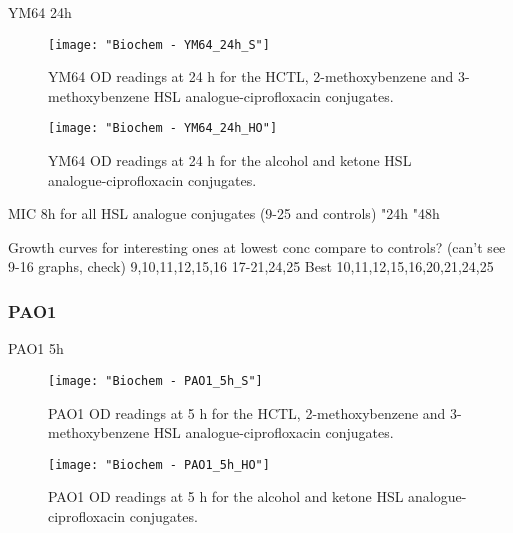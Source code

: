 YM64 24h

\begin{figure}[H]
	\begin{center}
		\texttt{[image: "Biochem - YM64\_24h\_S"]}
		\caption{YM64 OD readings at 24 h for the HCTL, 2-methoxybenzene and 3-methoxybenzene HSL analogue-ciprofloxacin conjugates.\label{fgr:YM64_24h_S}}
	\end{center}
\end{figure}

\begin{figure}[H]
	\begin{center}
		\texttt{[image: "Biochem - YM64\_24h\_HO"]}
		\caption{YM64 OD readings at 24 h for the alcohol and ketone HSL analogue-ciprofloxacin conjugates.\label{fgr:YM64_24h_HO}}
	\end{center}
\end{figure}




MIC 8h for all HSL analogue conjugates (9-25 and controls)
"24h
"48h

Growth curves for interesting ones at lowest conc compare to controls?
(can't see 9-16 graphs, check)
9,10,11,12,15,16
17-21,24,25
Best 10,11,12,15,16,20,21,24,25

\subsubsection{PAO1}

PAO1 5h

\begin{figure}[H]
	\begin{center}
		\texttt{[image: "Biochem - PAO1\_5h\_S"]}
		\caption{PAO1 OD readings at 5 h for the HCTL, 2-methoxybenzene and 3-methoxybenzene HSL analogue-ciprofloxacin conjugates.\label{fgr:PAO1_5h_S}}
	\end{center}
\end{figure}

\begin{figure}[H]
	\begin{center}
		\texttt{[image: "Biochem - PAO1\_5h\_HO"]}
		\caption{PAO1 OD readings at 5 h for the alcohol and ketone HSL analogue-ciprofloxacin conjugates.\label{fgr:PAO1_5h_HO}}
	\end{center}
\end{figure}



